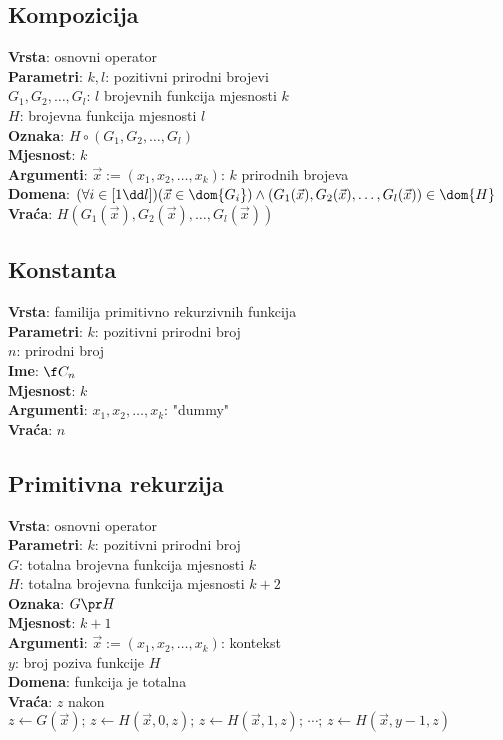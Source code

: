 \subsection{Kompozicija}
\textbf{Vrsta}: osnovni operator\\
\textbf{Parametri}: $k,l$: pozitivni prirodni brojevi\\
$G_1,G_2,\dots,G_l$: $l$ brojevnih funkcija mjesnosti $k$\\
$H$: brojevna funkcija mjesnosti $l$\\
\textbf{Oznaka}: $H\circ(G_1,G_2,\dots,G_l)$\\
\textbf{Mjesnost}: $k$\\
\textbf{Argumenti}: $\vec x:=(x_1,x_2,\dots,x_k)$: $k$ prirodnih brojeva\\
\textbf{Domena}: $(\forall i\in[1\dd l])(\vec x\in\dom{G_i})\land(G_1(\vec x),G_2(\vec x),\dots,G_l(\vec x))\in\dom{H}$\\
\textbf{Vraća}: $H(G_1(\vec x),G_2(\vec x),\dots,G_l(\vec x))$

\subsection{Konstanta}
\textbf{Vrsta}: familija primitivno rekurzivnih funkcija\\
\textbf{Parametri}: $k$: pozitivni prirodni broj\\
$n$: prirodni broj\\
\textbf{Ime}: $\f C_n$\\
\textbf{Mjesnost}: $k$\\
\textbf{Argumenti}: $x_1,x_2,\dots,x_k$: "dummy"\\
\textbf{Vraća}: $n$

\subsection{Primitivna rekurzija}
\textbf{Vrsta}: osnovni operator\\
\textbf{Parametri}: $k$: pozitivni prirodni broj\\
$G$: totalna brojevna funkcija mjesnosti $k$\\
$H$: totalna brojevna funkcija mjesnosti $k+2$\\
\textbf{Oznaka}: $G\pr H$\\
\textbf{Mjesnost}: $k+1$\\
\textbf{Argumenti}: $\vec x:=(x_1,x_2,\dots,x_k)$: kontekst\\
$y$: broj poziva funkcije $H$\\
\textbf{Domena}: funkcija je totalna\\
\textbf{Vraća}: $z$ nakon $z\leftarrow G(\vec x);\,z\leftarrow H(\vec x,0,z);\,z\leftarrow H(\vec x,1,z);\,\dotsm;\,z\leftarrow H(\vec x,y-1,z)$

